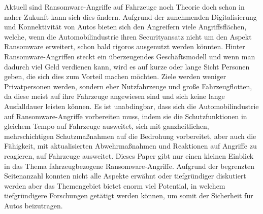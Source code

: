Aktuell sind Ransomware-Angriffe auf Fahrzeuge noch Theorie doch schon in naher 
Zukunft kann sich dies ändern. Aufgrund der zunehmenden Digitalisierung und Konnektivität 
von Autos bieten sich den Angreifern viele Angriffsflächen, welche, wenn die Automobilindustrie 
ihren Securityansatz nicht um den Aspekt Ransomware erweitert, schon bald rigoros ausgenutzt 
werden könnten. Hinter Ransomware-Angriffen steckt ein überzeugendes Geschäftsmodell und wenn 
man dadurch viel Geld verdienen kann, wird es auf kurze oder lange Sicht Personen geben, die 
sich dies zum Vorteil machen möchten.
\newline
Ziele werden weniger Privatpersonen werden, sondern eher Nutzfahrzeuge und große Fahrzeugflotten, 
da diese meist auf ihre Fahrzeuge angewiesen sind und sich keine lange Ausfalldauer leisten können.
\newline
Es ist unabdingbar, dass sich die Automobilindustrie auf Ransomware-Angriffe vorbereiten muss, 
indem sie die Schutzfunktionen in gleichem Tempo auf Fahrzeuge ausweitet, sich mit ganzheitlichen, 
mehrschichtigen Schutzmaßnahmen auf die Bedrohung vorbereitet, aber auch die Fähigkeit, mit 
aktualisierten Abwehrmaßnahmen und Reaktionen auf Angriffe zu reagieren, auf Fahrzeuge ausweitet.
\newline
Dieses Paper gibt nur einen kleinen Einblick in das Thema fahrzeugbezogene Ransomware-Angriffe. 
Aufgrund der begrenzten Seitenanzahl konnten nicht alle Aspekte erwähnt oder tiefgründiger diskutiert 
werden aber das Themengebiet bietet enorm viel Potential, in welchem tiefgründigere Forschungen 
getätigt werden können, um somit der Sicherheit für Autos beizutragen. 
